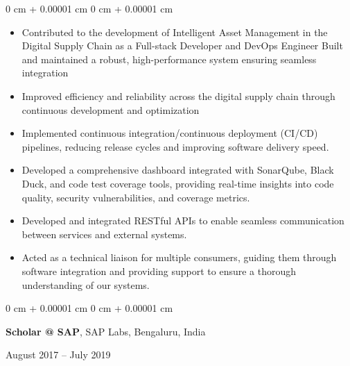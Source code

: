 \documentclass[10pt, letterpaper]{article}
\newenvironment{highlights}{
    \begin{itemize}[
        topsep=0.10 cm,
        parsep=0.10 cm,
        partopsep=0pt,
        itemsep=0pt,
        leftmargin=0 cm + 10pt
    ]
}{
    \end{itemize}
} %
\newenvironment{onecolentry}{
    \begin{adjustwidth}{
        0 cm + 0.00001 cm
    }{
        0 cm + 0.00001 cm
    }
}{
    \end{adjustwidth}
} %
\newenvironment{twocolentry}[2][]{
    \onecolentry
    \def\secondColumn{#2}
    \setcolumnwidth{\fill, 4.5 cm}
    \begin{paracol}{2}
}{
    \switchcolumn \raggedleft \secondColumn
    \end{paracol}
    \endonecolentry
} %
\begin{document}
        \vspace{0.10 cm}
        \begin{onecolentry}
            \begin{highlights}
                \item Contributed to the development of Intelligent Asset Management in the Digital Supply Chain as a Full-stack Developer and DevOps Engineer Built and maintained a robust, high-performance system ensuring seamless integration
                \item Improved efficiency and reliability across the digital supply chain through continuous development and optimization
                \item Implemented continuous integration/continuous deployment (CI/CD) pipelines, reducing release cycles and improving software delivery speed.
                \item Developed a comprehensive dashboard integrated with SonarQube, Black Duck, and code test coverage tools, providing real-time insights into code quality, security vulnerabilities, and coverage metrics.
                \item Developed and integrated RESTful APIs to enable seamless communication between services and external systems.
                \item Acted as a technical liaison for multiple consumers, guiding them through software integration and providing support to ensure a thorough understanding of our systems.
            \end{highlights}
        \end{onecolentry}

        \vspace{0.2 cm}

        \begin{twocolentry}{
            August 2017 – July 2019
        }
            \textbf{Scholar @ SAP}, SAP Labs, Bengaluru, India
        \end{twocolentry}
\end{document}
